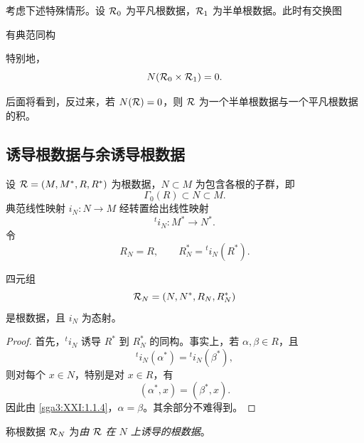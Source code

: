 考虑下述特殊情形。设 \(\mathcal{R}_0\) 为平凡根数据，\(\mathcal{R}_1\) 为半单根数据。此时有交换图
\begin{center}
\end{center}

\begin{lemma}\label{sga3:XXI:6.4.4}
有典范同构
\begin{center}
\end{center}
特别地，
\[
 N(\mathcal{R}_0\times\mathcal{R}_1)=0.
\]
\end{lemma}

后面将看到，反过来，若 \(N(\mathcal{R})=0\)，则 \(\mathcal{R}\) 为一个半单根数据与一个平凡根数据的积。

\subsection{诱导根数据与余诱导根数据}\label{sga3:XXI:6.5}

设 \(\mathcal{R}=(M,M^\ast,R,R^\ast)\) 为根数据，\(N\subset M\) 为包含各根的子群，即
\[
 \Gamma_0(R)\subset N\subset M.
\]
典范线性映射 \(i_N:N\to M\) 经转置给出线性映射
\[
 {}^ti_N:M^\ast\longrightarrow N^\ast.
\]
令
\[
 R_N=R,
 \qquad
 R_N^\ast={}^ti_N(R^\ast).
\]

\begin{lemma}\label{sga3:XXI:6.5.1}
四元组
\[
 \mathcal{R}_N=(N,N^\ast,R_N,R_N^\ast)
\]
是根数据，且 \(i_N\) 为态射。
\end{lemma}

\begin{proof}
首先，\({}^ti_N\) 诱导 \(R^\ast\) 到 \(R_N^\ast\) 的同构。事实上，若 \(\alpha,\beta\in R\)，且
\[
 {}^ti_N(\alpha^\ast)={}^ti_N(\beta^\ast),
\]
则对每个 \(x\in N\)，特别是对 \(x\in R\)，有
\[
 (\alpha^\ast,x)=(\beta^\ast,x).
\]
因此由 \ref{sga3:XXI:1.1.4}，\(\alpha=\beta\)。其余部分不难得到。
\end{proof}

\begin{definition}\label{sga3:XXI:6.5.2}
称根数据 \(\mathcal{R}_N\) 为\emph{由 \(\mathcal{R}\) 在 \(N\) 上诱导的根数据}。
\end{definition}

